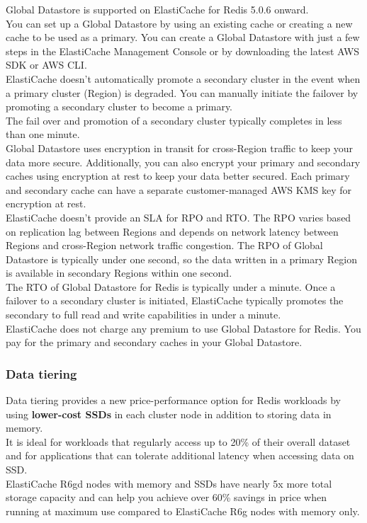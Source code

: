 \documentclass[12pt, letterpaper, twoside]{article}
\begin{document}
Global Datastore is supported on ElastiCache for Redis 5.0.6 onward.\\

You can set up a Global Datastore by using an existing cache or creating a new cache to be used as a primary. You can create a 
Global Datastore with just a few steps in the ElastiCache Management Console or by downloading the latest AWS SDK or AWS CLI.\\

ElastiCache doesn’t automatically promote a secondary cluster in the event when a primary cluster (Region) is degraded. 
You can manually initiate the failover by promoting a secondary cluster to become a primary.\\
The fail over and promotion of a secondary cluster typically completes in less than one minute.\\

Global Datastore uses encryption in transit for cross-Region traffic to keep your data more secure. Additionally, you can also 
encrypt your primary and secondary caches using encryption at rest to keep your data better secured. Each primary and secondary 
cache can have a separate customer-managed AWS KMS key for encryption at rest.\\

ElastiCache doesn’t provide an SLA for RPO and RTO. The RPO varies based on replication lag between Regions and depends on network 
latency between Regions and cross-Region network traffic congestion. The RPO of Global Datastore is typically under one second, 
so the data written in a primary Region is available in secondary Regions within one second.\\
The RTO of Global Datastore for Redis is typically under a minute. Once a failover to a secondary cluster is initiated, 
ElastiCache typically promotes the secondary to full read and write capabilities in under a minute.\\

ElastiCache does not charge any premium to use Global Datastore for Redis. You pay for the primary and secondary caches in 
your Global Datastore.\\

\subsubsection{Data tiering}
Data tiering provides a new price-performance option for Redis workloads by using \textbf{lower-cost SSDs} in 
each cluster node in addition to storing data in memory.\\
It is ideal for workloads that regularly access up to 20\% of their overall dataset and for applications that can tolerate 
additional latency when accessing data on SSD.\\
ElastiCache R6gd nodes with memory and SSDs have nearly 5x more total storage capacity and can help you achieve over 60\% 
savings in price when running at maximum use compared to ElastiCache R6g nodes with memory only.\\
\end{document}
